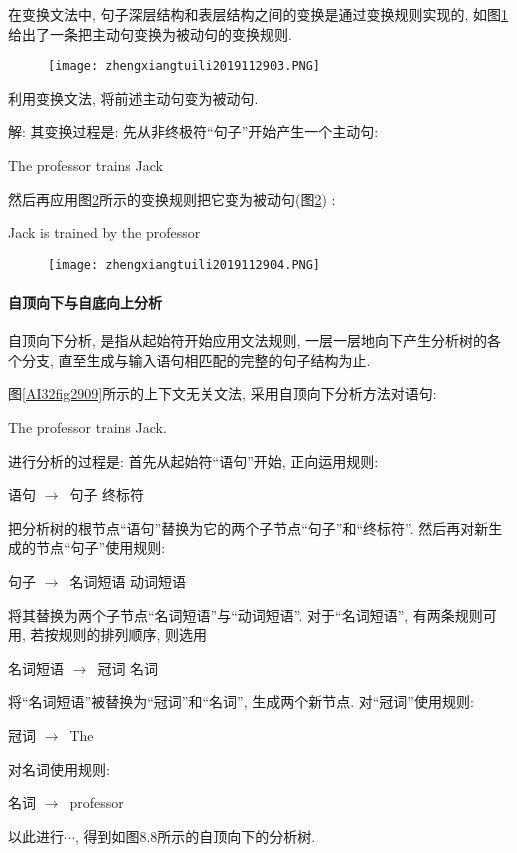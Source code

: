 在变换文法中, 句子深层结构和表层结构之间的变换是通过变换规则实现的, 如图\ref{AI32fig2903}给出了一条把主动句变换为被动句的变换规则.
\begin{figure}[H]
\centering
\texttt{[image: zhengxiangtuili2019112903.PNG]}
\caption{}
\label{AI32fig2903}
\end{figure}
\begin{example}
  利用变换文法, 将前述主动句变为被动句.
\end{example}

解: 其变换过程是: 先从非终极符“句子”开始产生一个主动句:
\begin{center}
  The  professor  trains  Jack
\end{center}

然后再应用图\ref{AI32fig2904}所示的变换规则把它变为被动句(图\ref{AI32fig2904}) :
\begin{center}
  Jack  is  trained  by  the  professor
\end{center}
\begin{figure}[H]
\centering
\texttt{[image: zhengxiangtuili2019112904.PNG]}
\caption{}
\label{AI32fig2904}
\end{figure}
\paragraph{自顶向下与自底向上分析}
自顶向下分析, 是指从起始符开始应用文法规则, 一层一层地向下产生分析树的各个分支, 直至生成与输入语句相匹配的完整的句子结构为止.

\begin{example}
图\ref{AI32fig2909}所示的上下文无关文法, 采用自顶向下分析方法对语句:
\begin{center}
  The  professor  trains  Jack.
\end{center}
\end{example}

进行分析的过程是:
    首先从起始符“语句”开始, 正向运用规则:
\begin{center}
  语句 $\rightarrow$\,  句子   终标符
\end{center}
把分析树的根节点“语句”替换为它的两个子节点“句子”和“终标符”.
    然后再对新生成的节点“句子”使用规则:
\begin{center}
  句子 $\rightarrow$\,  名词短语   动词短语
\end{center}
将其替换为两个子节点“名词短语”与“动词短语”.
    对于“名词短语”, 有两条规则可用, 若按规则的排列顺序, 则选用
\begin{center}
  名词短语 $\rightarrow$\,  冠词    名词
\end{center}
将“名词短语”被替换为“冠词”和“名词”, 生成两个新节点. 对“冠词”使用规则:
\begin{center}
  冠词 $\rightarrow$\,  The
\end{center}
对名词使用规则:
\begin{center}
  名词 $\rightarrow$\,  professor
\end{center}
以此进行$\cdots$, 得到如图8.8所示的自顶向下的分析树.
